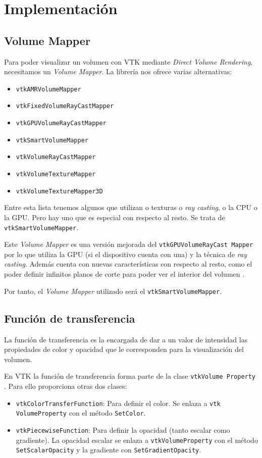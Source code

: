 \chapter{Implementación}

\section{Volume Mapper}

Para poder visualizar un volumen con VTK mediante \textit{Direct Volume Rendering}, necesitamos un \textit{Volume Mapper}. La librería nos ofrece varias alternativas:
\begin{itemize}
	\item \texttt{vtkAMRVolumeMapper}
	\item \texttt{vtkFixedVolumeRayCastMapper}
	\item \texttt{vtkGPUVolumeRayCastMapper}
	\item \texttt{vtkSmartVolumeMapper}
	\item \texttt{vtkVolumeRayCastMapper}
	\item \texttt{vtkVolumeTextureMapper}
	\item \texttt{vtkVolumeTextureMapper3D}
\end{itemize}

Entre esta lista tenemos algunos que utilizan o texturas o \textit{ray casting}, o la CPU o la GPU. Pero hay uno que es especial con respecto al resto. Se trata de \texttt{vtkSmartVolumeMapper}.

Este \textit{Volume Mapper} es una versión mejorada del \texttt{vtkGPUVolumeRayCast Mapper} por lo que utiliza la GPU (si el dispositivo cuenta con una) y la técnica de \textit{ray casting}. Además cuenta con nuevas características con respecto al resto, como el poder definir infinitos planos de corte para poder ver el interior del volumen \cite{smart_volume_mapper}.

Por tanto, el \textit{Volume Mapper} utilizado será el \texttt{vtkSmartVolumeMapper}.

\section{Función de transferencia}

La función de transferencia es la encargada de dar a un valor de intensidad las propiedades de color y opacidad que le corresponden para la visualización del volumen.

En VTK la función de transferencia forma parte de la clase \texttt{vtkVolume Property} \cite{vtk_example_medical4}. Para ello proporciona otras dos clases:
\begin{itemize}
	\item \texttt{vtkColorTransferFunction}: Para definir el color. Se enlaza a \texttt{vtk VolumeProperty} con el método \texttt{SetColor}.
	\item \texttt{vtkPiecewiseFunction}: Para definir la opacidad (tanto escalar como gradiente). La opacidad escalar se enlaza a \texttt{vtkVolumeProperty} con el método \texttt{SetScalarOpacity} y la gradiente con \texttt{SetGradientOpacity}.
\end{itemize}

